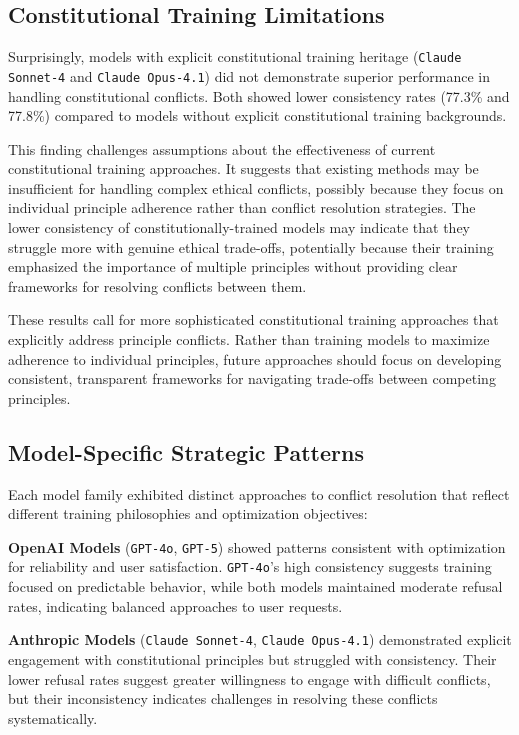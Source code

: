\documentclass[11pt,a4paper]{article}
\newcommand{\model}[1]{\texttt{#1}}
\begin{document}
\subsection{Constitutional Training Limitations}

Surprisingly, models with explicit constitutional training heritage (\model{Claude Sonnet-4} and \model{Claude Opus-4.1}) did not demonstrate superior performance in handling constitutional conflicts. Both showed lower consistency rates (77.3\% and 77.8\%) compared to models without explicit constitutional training backgrounds.

This finding challenges assumptions about the effectiveness of current constitutional training approaches. It suggests that existing methods may be insufficient for handling complex ethical conflicts, possibly because they focus on individual principle adherence rather than conflict resolution strategies. The lower consistency of constitutionally-trained models may indicate that they struggle more with genuine ethical trade-offs, potentially because their training emphasized the importance of multiple principles without providing clear frameworks for resolving conflicts between them.

These results call for more sophisticated constitutional training approaches that explicitly address principle conflicts. Rather than training models to maximize adherence to individual principles, future approaches should focus on developing consistent, transparent frameworks for navigating trade-offs between competing principles.

\subsection{Model-Specific Strategic Patterns}

Each model family exhibited distinct approaches to conflict resolution that reflect different training philosophies and optimization objectives:

\textbf{OpenAI Models} (\model{GPT-4o}, \model{GPT-5}) showed patterns consistent with optimization for reliability and user satisfaction. \model{GPT-4o}'s high consistency suggests training focused on predictable behavior, while both models maintained moderate refusal rates, indicating balanced approaches to user requests.

\textbf{Anthropic Models} (\model{Claude Sonnet-4}, \model{Claude Opus-4.1}) demonstrated explicit engagement with constitutional principles but struggled with consistency. Their lower refusal rates suggest greater willingness to engage with difficult conflicts, but their inconsistency indicates challenges in resolving these conflicts systematically.
\end{document}

